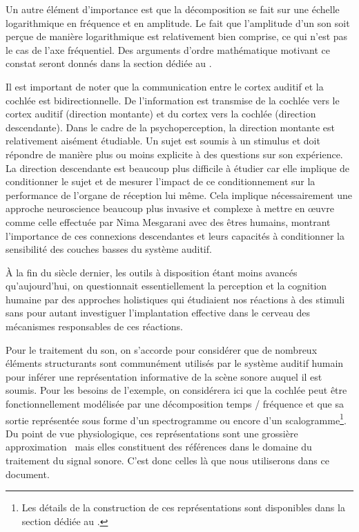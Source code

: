 Un autre élément d'importance est que la décomposition se fait sur une échelle logarithmique en fréquence et en amplitude. Le fait que l'amplitude d'un son soit perçue de manière logarithmique est relativement bien comprise, ce qui n'est pas le cas de l'axe fréquentiel. Des arguments d'ordre mathématique motivant ce constat seront donnés dans la section dédiée au .

Il est important de noter que la communication entre le cortex auditif et la cochlée est bidirectionnelle. De l'information est transmise de la cochlée vers le cortex auditif (direction montante) et du cortex vers la cochlée (direction descendante). Dans le cadre de la psychoperception, la direction montante est relativement aisément étudiable. Un sujet est soumis à un stimulus et doit répondre de manière plus ou moins explicite à des questions sur son expérience. La direction descendante est beaucoup plus difficile à étudier car elle implique de conditionner le sujet et de mesurer l'impact de ce conditionnement sur la performance de l'organe de réception lui même. Cela implique nécessairement une approche \og neuroscience \fg beaucoup plus invasive et complexe à mettre en \oe{}uvre comme celle effectuée par Nima Mesgarani avec des êtres humains, montrant l'importance de ces connexions descendantes et leurs capacités à conditionner la sensibilité des couches basses du système auditif.~\cite{mesgarani2012selective}

\`A la fin du siècle dernier, les outils à disposition étant moins avancés qu'aujourd'hui, on questionnait essentiellement la perception et la cognition humaine par des approches \og holistiques \fg qui étudiaient nos réactions à des stimuli sans pour autant investiguer l'implantation effective dans le cerveau des mécanismes responsables de ces réactions.

Pour le traitement du son, on s'accorde pour considérer que de nombreux éléments structurants sont communément utilisés par le système auditif humain pour inférer une représentation informative de la scène sonore auquel il est soumis. Pour les besoins de l'exemple, on considérera ici que la cochlée peut être fonctionnellement modélisée par une décomposition temps / fréquence et que sa sortie représentée sous forme d'un spectrogramme ou encore d'un scalogramme\footnote{Les détails de la construction de ces représentations sont disponibles dans la section dédiée au .}. Du point de vue physiologique, ces représentations sont une grossière approximation~\cite{lyon2017human} mais elles constituent des références dans le domaine du traitement du signal sonore. C'est donc celles là que nous utiliserons dans ce document.


